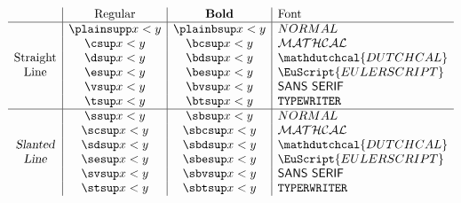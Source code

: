 \documentclass{article}
\begin{document}
\[
    \begin{array}{c|c|c|l}
        & \text{Regular} & \textbf{Bold} & \text{Font} \\ \hline
        & \plainsupp x < y & \plainbsup x < y & NORMAL \\
        & \csup x < y & \bcsup x < y & \mathcal{MATHCAL} \\
        \text{Straight} & \dsup x < y & \bdsup x < y & \mathdutchcal{DUTCHCAL} \\
        \text{Line} & \esup x < y & \besup x < y & \EuScript{EULERSCRIPT} \\
        & \vsup x < y & \bvsup x < y & \mathsf{SANS\ SERIF} \\
        & \tsup x < y & \btsup x < y & \mathtt{TYPEWRITER} \\ \hline
        & \ssup x < y & \sbsup x < y & NORMAL \\
        & \scsup x < y & \sbcsup x < y & \mathcal{MATHCAL} \\
        \textsl{Slanted} & \sdsup x < y & \sbdsup x < y & \mathdutchcal{DUTCHCAL} \\
        \textsl{Line} & \sesup x < y & \sbesup x < y & \EuScript{EULERSCRIPT} \\
        & \svsup x < y & \sbvsup x < y & \mathsf{SANS\ SERIF} \\
        & \stsup x < y & \sbtsup x < y & \mathtt{TYPERWRITER}
    \end{array}
\]
\end{document}
